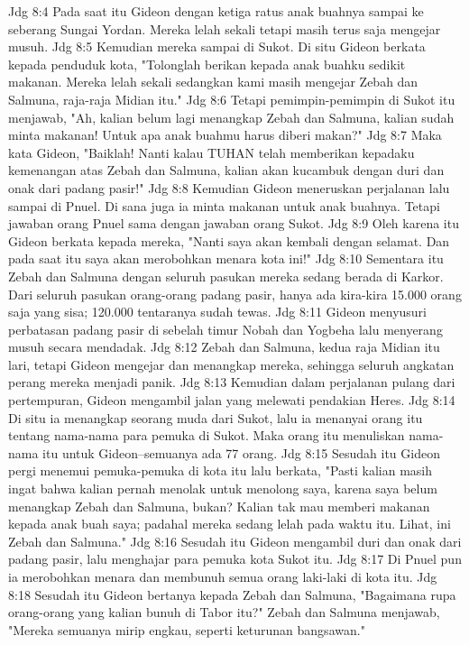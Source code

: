 Jdg 8:4  Pada saat itu Gideon dengan ketiga ratus anak buahnya sampai ke seberang Sungai Yordan. Mereka lelah sekali tetapi masih terus saja mengejar musuh.
Jdg 8:5  Kemudian mereka sampai di Sukot. Di situ Gideon berkata kepada penduduk kota, "Tolonglah berikan kepada anak buahku sedikit makanan. Mereka lelah sekali sedangkan kami masih mengejar Zebah dan Salmuna, raja-raja Midian itu."
Jdg 8:6  Tetapi pemimpin-pemimpin di Sukot itu menjawab, "Ah, kalian belum lagi menangkap Zebah dan Salmuna, kalian sudah minta makanan! Untuk apa anak buahmu harus diberi makan?"
Jdg 8:7  Maka kata Gideon, "Baiklah! Nanti kalau TUHAN telah memberikan kepadaku kemenangan atas Zebah dan Salmuna, kalian akan kucambuk dengan duri dan onak dari padang pasir!"
Jdg 8:8  Kemudian Gideon meneruskan perjalanan lalu sampai di Pnuel. Di sana juga ia minta makanan untuk anak buahnya. Tetapi jawaban orang Pnuel sama dengan jawaban orang Sukot.
Jdg 8:9  Oleh karena itu Gideon berkata kepada mereka, "Nanti saya akan kembali dengan selamat. Dan pada saat itu saya akan merobohkan menara kota ini!"
Jdg 8:10  Sementara itu Zebah dan Salmuna dengan seluruh pasukan mereka sedang berada di Karkor. Dari seluruh pasukan orang-orang padang pasir, hanya ada kira-kira 15.000 orang saja yang sisa; 120.000 tentaranya sudah tewas.
Jdg 8:11  Gideon menyusuri perbatasan padang pasir di sebelah timur Nobah dan Yogbeha lalu menyerang musuh secara mendadak.
Jdg 8:12  Zebah dan Salmuna, kedua raja Midian itu lari, tetapi Gideon mengejar dan menangkap mereka, sehingga seluruh angkatan perang mereka menjadi panik.
Jdg 8:13  Kemudian dalam perjalanan pulang dari pertempuran, Gideon mengambil jalan yang melewati pendakian Heres.
Jdg 8:14  Di situ ia menangkap seorang muda dari Sukot, lalu ia menanyai orang itu tentang nama-nama para pemuka di Sukot. Maka orang itu menuliskan nama-nama itu untuk Gideon--semuanya ada 77 orang.
Jdg 8:15  Sesudah itu Gideon pergi menemui pemuka-pemuka di kota itu lalu berkata, "Pasti kalian masih ingat bahwa kalian pernah menolak untuk menolong saya, karena saya belum menangkap Zebah dan Salmuna, bukan? Kalian tak mau memberi makanan kepada anak buah saya; padahal mereka sedang lelah pada waktu itu. Lihat, ini Zebah dan Salmuna."
Jdg 8:16  Sesudah itu Gideon mengambil duri dan onak dari padang pasir, lalu menghajar para pemuka kota Sukot itu.
Jdg 8:17  Di Pnuel pun ia merobohkan menara dan membunuh semua orang laki-laki di kota itu.
Jdg 8:18  Sesudah itu Gideon bertanya kepada Zebah dan Salmuna, "Bagaimana rupa orang-orang yang kalian bunuh di Tabor itu?" Zebah dan Salmuna menjawab, "Mereka semuanya mirip engkau, seperti keturunan bangsawan."
